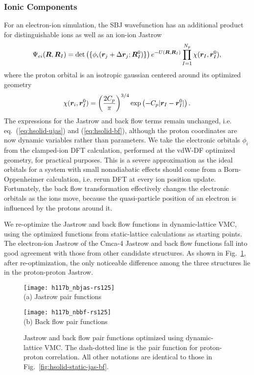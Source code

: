 \subsubsection{Ionic Components}
For an electron-ion simulation, the SBJ wavefunction has an additional product for distinguishable ions as well as an ion-ion Jastrow
\begin{align} \label{eq:hsolid-ei-wf}
\Psi_{ei}(\boldsymbol{R}, \boldsymbol{R}_I) = \det\left( \{ \phi_i(\boldsymbol{r}_j+\Delta\boldsymbol{r}_j; \boldsymbol{R}_I^0)\} \right) e^{-U(\boldsymbol{R},\boldsymbol{R}_I)} \prod\limits_{I=1}^{N_p} \chi(\boldsymbol{r}_I, \boldsymbol{r}_I^0),
\end{align}
where the proton orbital is an isotropic gaussian centered around its optimized geometry
\begin{align}
\chi(\boldsymbol{r}_i, \boldsymbol{r}_I^0) = \left(\dfrac{2C_p}{\pi}\right)^{3/4} \exp\left(
-C_p\vert\boldsymbol{r}_I-\boldsymbol{r}_I^0\vert
\right).
\end{align}
The expressions for the Jastrow and back flow terms remain unchanged, i.e. eq.~(\ref{eq:hsolid-ujas}) and (\ref{eq:hsolid-bf}), although the proton coordinates are now dynamic variables rather than parameters.
We take the electronic orbitals $\phi_i$ from the clamped-ion DFT calculation, performed at the vdW-DF optimized geometry, for practical purposes.
This is a severe approximation as the ideal orbitals for a system with small nonadiabatic effects should come from a Born-Oppenheimer calculation, i.e. rerun DFT at every ion position update.
Fortunately, the back flow transformation effectively changes the electronic orbitals as the ions move, because the quasi-particle position of an electron is influenced by the protons around it.

We re-optimize the Jastrow and back flow functions in dynamic-lattice VMC, using the optimized functions from static-lattice calculations as starting points.
The electron-ion Jastrow of the Cmca-4 Jastrow and back flow functions fall into good agreement with those from other candidate structures.
As shown in Fig.~\ref{fig:hsolid-dynamic-jas-bf}, after re-optimization, the only noticeable difference among the three structures lie in the proton-proton Jastrow.

\begin{figure}[h]
	\centering
	\begin{minipage}{0.49\textwidth}
		\centering
		\texttt{[image: h117b\_nbjas-rs125]}\\
		(a) Jastrow pair functions
	\end{minipage}
	\begin{minipage}{0.49\textwidth}
		\centering
		\texttt{[image: h117b\_nbbf-rs125]}\\
		(b) Back flow pair functions
	\end{minipage}
	\caption{Jastrow and back flow pair functions optimized using dynamic-lattice VMC. The dash-dotted line is the pair function for proton-proton correlation. All other notations are identical to those in Fig.~\ref{fig:hsolid-static-jas-bf}.}
	\label{fig:hsolid-dynamic-jas-bf}
\end{figure}

